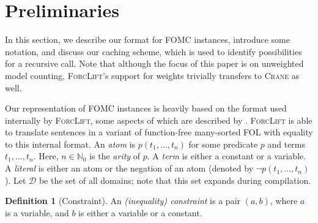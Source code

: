 \documentclass[letterpaper]{article} %
\theoremstyle{definition}
\newtheorem{definition}{Definition}
\theoremstyle{remark}
\begin{document}

\section{Preliminaries}\label{sec:recprelims}

In this section, we describe our format for FOMC instances, introduce some
notation, and discuss our caching scheme, which is used to identify
possibilities for a recursive call. Note that although the focus of this paper
is on unweighted model counting, \textsc{ForcLift}'s
\citep{DBLP:conf/ijcai/BroeckTMDR11} support for weights trivially transfers to
\textsc{Crane} as well.

Our representation of FOMC instances is heavily based on the format used
internally by \textsc{ForcLift}, some aspects of which are described by
\citet{DBLP:conf/ijcai/BroeckTMDR11}. \textsc{ForcLift} is able to translate
sentences in a variant of function-free many-sorted FOL with equality to this
internal format. An \emph{atom} is $p(t_1, \dots, t_n)$ for some predicate $p$
and terms $t_{1}, \dots, t_{n}$. Here, $n \in \mathbb{N}_0$ is the \emph{arity}
of $p$. A \emph{term} is either a constant or a variable. A \emph{literal} is
either an atom or the negation of an atom (denoted by
$\neg p(t_1, \dots, t_n)$). Let $\mathcal{D}$ be the set of all domains; note
that this set expands during compilation.

\begin{definition}[Constraint]\label{def:constraint}
  An \emph{(inequality) constraint} is a pair $(a, b)$, where $a$ is a variable,
  and $b$ is either a variable or a constant.
\end{definition}
\end{document}
